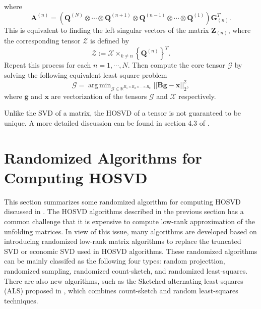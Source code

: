 \documentclass[preprint]{elsarticle}
\DeclareMathOperator*{\argmin}{arg\,min}
\begin{document}
where
\[
    \mathbf{A}^{(n)} = \left(\mathbf{Q}^{(N)}\otimes\cdots\otimes\mathbf{Q}^{(n+1)}
    \otimes\mathbf{Q}^{(n-1)}\otimes\cdots\otimes\mathbf{Q}^{(1)}\right)\mathbf{G}_{(n)}^T.
\]
This is equivalent to finding the left singular vectors of the matrix $\mathbf{Z}_{(n)}$, where
the corresponding tensor $\boldsymbol{\mathscr{Z}}$ is defined by
\[
    \boldsymbol{\mathscr{Z}} := \boldsymbol{\mathscr{X}}\times_{k\neq n}\left\{\mathbf{Q}^{(n)}\right\}^T.
\]
Repeat this process for each $n=1,\cdots, N$. Then compute the core tensor $\boldsymbol{\mathscr{G}}$
by solving the following equivalent least square problem
\begin{equation}
    \boldsymbol{\mathscr{G}}=\argmin_{\boldsymbol{\mathscr{G}}\in\mathbb{R}^{R_1\times R_2\times\cdots\times R_n}}
    ||\mathbf{B}\mathbf{g}-\mathbf{x}||_2^2,
\end{equation}
where $\mathbf{g}$ and $\mathbf{x}$ are vectorization of the tensors $\boldsymbol{\mathscr{G}}$ and
$\boldsymbol{\mathscr{X}}$ respectively.
\begin{rmk}
Unlike the SVD of a matrix, the HOSVD of a tensor is not guaranteed to be unique. A more detailed discussion
can be found in section 4.3 of \cite{Kolda2009}.
\end{rmk}
\section{Randomized Algorithms for Computing HOSVD}
\noindent This section summarizes some randomized algorithm for computing HOSVD discussed in \cite{9350569}. The HOSVD algorithms
described in the previous section has a common challenge that it is expensive to compute low-rank approximation of the unfolding matrices.
In view of this issue, many algorithms are developed based on introducing randomized low-rank matrix algorithms to replace the truncated SVD or
economic SVD used in HOSVD algorithms.
These randomized algorithms can be mainly classifed as the following four types: random projecttion,
randomized sampling, randomized count-sketch, and randomized least-squares. There are also new algorithms, such as the Sketched
alternating least-squares (ALS) proposed in \cite{ma2021fast}, which combines count-sketch and random least-squares techniques.
\end{document}

